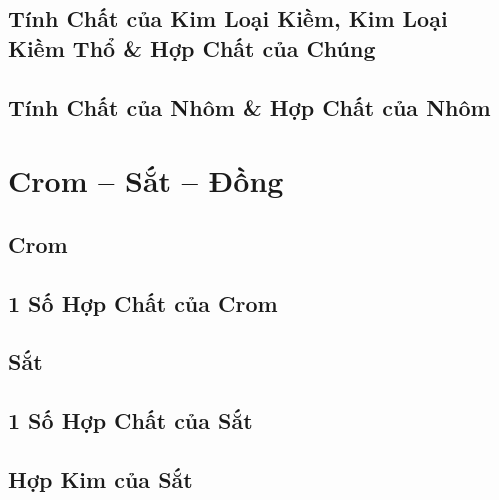 \documentclass{article}
\numberwithin{equation}{section}
\begin{document}
\subsection{Tính Chất của Kim Loại Kiềm, Kim Loại Kiềm Thổ \& Hợp Chất của Chúng}


\subsection{Tính Chất của Nhôm \& Hợp Chất của Nhôm}


\section{Crom -- Sắt -- Đồng}

\subsection{Crom}


\subsection{1 Số Hợp Chất của Crom}


\subsection{Sắt}


\subsection{1 Số Hợp Chất của Sắt}


\subsection{Hợp Kim của Sắt}
\end{document}

